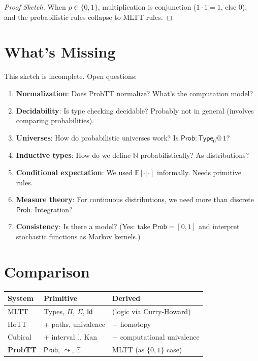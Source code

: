 \documentclass[11pt,a4paper]{article}
\makeatletter
\newcommand{\Prob}{\mathsf{Prob}}
\newcommand{\E}{\mathbb{E}}
\newcommand{\pmark}[1]{@\, #1}  %
\makeatother
\begin{document}
\begin{proof}[Proof Sketch]
When $p \in \{0,1\}$, multiplication is conjunction ($1 \cdot 1 = 1$, else $0$), and the probabilistic rules collapse to MLTT rules.
\end{proof}

\section{What's Missing}

This sketch is incomplete. Open questions:

\begin{enumerate}
    \item \textbf{Normalization}: Does ProbTT normalize? What's the computation model?

    \item \textbf{Decidability}: Is type checking decidable? Probably not in general (involves comparing probabilities).

    \item \textbf{Universes}: How do probabilistic universes work? Is $\Prob : \mathsf{Type}_0 \pmark{1}$?

    \item \textbf{Inductive types}: How do we define $\mathbb{N}$ probabilistically? As distributions?

    \item \textbf{Conditional expectation}: We used $\E[\cdot | \cdot]$ informally. Needs primitive rules.

    \item \textbf{Measure theory}: For continuous distributions, we need more than discrete $\Prob$. Integration?

    \item \textbf{Consistency}: Is there a model? (Yes: take $\Prob = [0,1]$ and interpret stochastic functions as Markov kernels.)
\end{enumerate}

\section{Comparison}

\begin{center}
\begin{tabular}{lll}
\textbf{System} & \textbf{Primitive} & \textbf{Derived} \\
\hline
MLTT & Types, $\Pi$, $\Sigma$, $\mathsf{Id}$ & (logic via Curry-Howard) \\
HoTT & + paths, univalence & + homotopy \\
Cubical & + interval $\mathbb{I}$, Kan & + computational univalence \\
\textbf{ProbTT} & $\Prob$, $\leadsto$, $\E$ & MLTT (as $\{0,1\}$ case)
\end{tabular}
\end{center}
\end{document}
